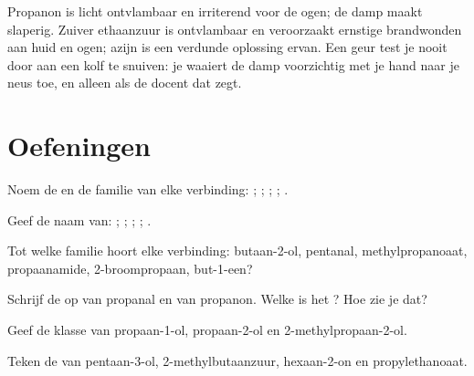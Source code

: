 \begin{safety}{}
Propanon is licht ontvlambaar en irriterend voor de ogen; de damp maakt
slaperig. Zuiver ethaanzuur is ontvlambaar en veroorzaakt ernstige
brandwonden aan huid en ogen; azijn is een verdunde oplossing ervan. Een
geur test je nooit door aan een kolf te snuiven: je waaiert de damp
voorzichtig met je hand naar je neus toe, en alleen als de docent dat
zegt.
\end{safety}

\section{Oefeningen}


\begin{exercise}[$\star$]\label{exo:g11:functional-groups:1}
Noem de  en de familie van elke verbinding:
; ; ;
; .
\end{exercise}

\begin{exercise}[$\star$]\label{exo:g11:functional-groups:2}
Geef de naam van: ; ; ;
; .
\end{exercise}

\begin{exercise}[$\star$]\label{exo:g11:functional-groups:3}
Tot welke familie hoort elke verbinding: butaan-2-ol, pentanal,
methylpropanoaat, propaanamide, 2-broompropaan, but-1-een?
\end{exercise}

\begin{exercise}[$\star$]\label{exo:g11:functional-groups:4}
Schrijf de  op van propanal en van propanon.
Welke is het ? Hoe zie je dat?
\end{exercise}

\begin{exercise}[$\star$]\label{exo:g11:functional-groups:5}
Geef de klasse van propaan-1-ol, propaan-2-ol en 2-methylpropaan-2-ol.
\end{exercise}

\begin{exercise}[$\star\star$]\label{exo:g11:functional-groups:6}
Teken de  van pentaan-3-ol, 2-methylbutaanzuur,
hexaan-2-on en propylethanoaat.
\end{exercise}


